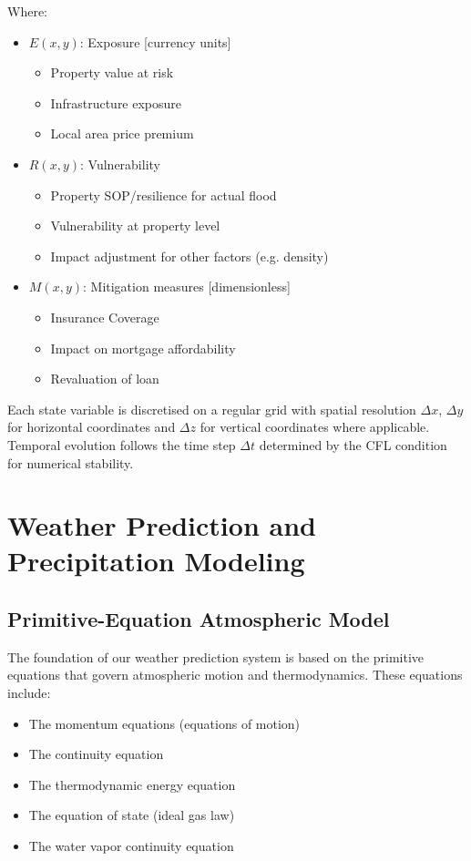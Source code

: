 \documentclass{article}
\begin{document}
Where:
\begin{itemize}
\item $E(x,y)$: Exposure [currency units]
    \begin{itemize}
    \item Property value at risk
    \item Infrastructure exposure
    \item Local area price premium
    \end{itemize}

\item $R(x,y)$: Vulnerability
    \begin{itemize}
    \item Property SOP/resilience for actual flood
    \item Vulnerability at property level
    \item Impact adjustment for other factors (e.g. density)
    \end{itemize}

\item $M(x,y)$: Mitigation measures [dimensionless]
    \begin{itemize}
    \item Insurance Coverage
    \item Impact on mortgage affordability
    \item Revaluation of loan
    \end{itemize}
\end{itemize}

Each state variable is discretised on a regular grid with spatial resolution $\Delta x$, $\Delta y$ for horizontal coordinates and $\Delta z$ for vertical coordinates where applicable. Temporal evolution follows the time step $\Delta t$ determined by the CFL condition for numerical stability.

\section{Weather Prediction and Precipitation Modeling}

\subsection{Primitive-Equation Atmospheric Model}
The foundation of our weather prediction system is based on the primitive equations that govern atmospheric motion and thermodynamics. These equations include:

\begin{itemize}
    \item The momentum equations (equations of motion)
    \item The continuity equation 
    \item The thermodynamic energy equation
    \item The equation of state (ideal gas law)
    \item The water vapor continuity equation
\end{itemize}
\end{document}
